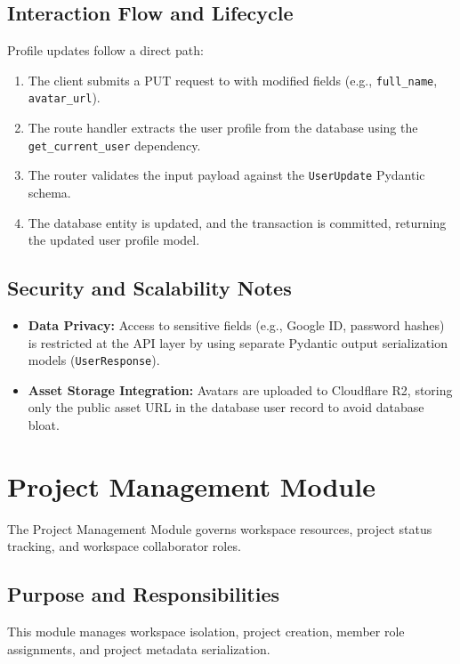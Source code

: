 \subsection{Interaction Flow and Lifecycle}
Profile updates follow a direct path:
\begin{enumerate}
    \item The client submits a PUT request to  with modified fields (e.g., \texttt{full\_name}, \texttt{avatar\_url}).
    \item The route handler extracts the user profile from the database using the \texttt{get\_current\_user} dependency.
    \item The router validates the input payload against the \texttt{UserUpdate} Pydantic schema.
    \item The database entity is updated, and the transaction is committed, returning the updated user profile model.
\end{enumerate}

\subsection{Security and Scalability Notes}
\begin{itemize}
    \item \textbf{Data Privacy:} Access to sensitive fields (e.g., Google ID, password hashes) is restricted at the API layer by using separate Pydantic output serialization models (\texttt{UserResponse}).
    \item \textbf{Asset Storage Integration:} Avatars are uploaded to Cloudflare R2, storing only the public asset URL in the database user record to avoid database bloat.
\end{itemize}

\section{Project Management Module}
The Project Management Module governs workspace resources, project status tracking, and workspace collaborator roles.

\subsection{Purpose and Responsibilities}
This module manages workspace isolation, project creation, member role assignments, and project metadata serialization.

